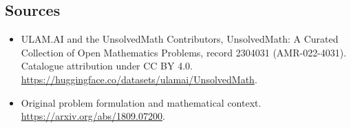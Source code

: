 \documentclass[11pt]{article}
\begin{document}
\subsection{Sources}
\begin{itemize}
\item[\hypertarget{source:2304031:1}{S1}] ULAM.AI and the UnsolvedMath Contributors, UnsolvedMath: A Curated Collection of Open Mathematics Problems, record 2304031 (AMR-022-4031). Catalogue attribution under CC BY 4.0.
\url{https://huggingface.co/datasets/ulamai/UnsolvedMath}.
\item[\hypertarget{source:2304031:2}{S2}] Original problem formulation and mathematical context.
\url{https://arxiv.org/abs/1809.07200}.
\end{itemize}
\label{end:2304031}
\end{document}
